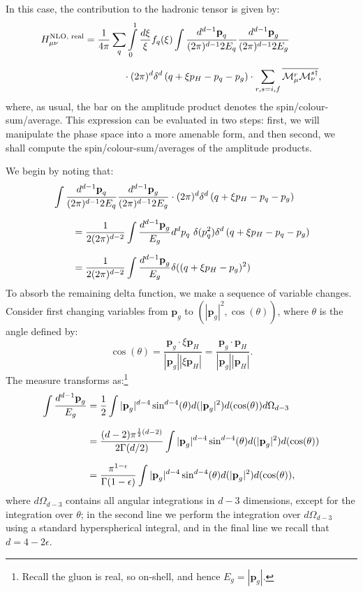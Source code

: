 \documentclass[withindex,glossary]{cam-thesis}
\renewcommand{\vec}[1]{\textbf{#1}} %
\begin{document}
In this case, the contribution to the hadronic tensor is given by:
\begin{align}
\label{eq:hadronic_nlo_real}
H_{\mu\nu}^{\text{NLO, real}} &= \frac{1}{4\pi} \sum_{q} \int\limits_{0}^{1} \frac{d\xi}{\xi} f_q(\xi) \int \frac{d^{d-1} \vec{p}_{q}}{(2\pi)^{d-1} 2E_{q}}  \frac{d^{d-1} \vec{p}_{g}}{(2\pi)^{d-1} 2E_{g}} \notag\\[1.5ex]
&\qquad\qquad\cdot (2\pi)^d \delta^d\left(q + \xi p_H - p_q - p_g\right) \cdot \sum_{r,s=i,f} \overline{\mathcal{M}_{\mu}^r \mathcal{M}_{\nu}^{s\dagger}} ,
\end{align}
where, as usual, the bar on the amplitude product denotes the spin/colour-sum/average. This expression can be evaluated in two steps: first, we will manipulate the phase space into a more amenable form, and then second, we shall compute the spin/colour-sum/averages of the amplitude products.

We begin by noting that:
\begin{align}
&\int \frac{d^{d-1} \vec{p}_{q}}{(2\pi)^{d-1} 2E_{q}}  \frac{d^{d-1} \vec{p}_{g}}{(2\pi)^{d-1} 2E_{g}} \cdot (2\pi)^d \delta^d\left(q + \xi p_H - p_q - p_g\right) \notag\\[1.5ex]
&\qquad= \frac{1}{2(2\pi)^{d-2}} \int  \frac{d^{d-1} \vec{p}_{g}}{E_{g}} d^d p_q\ \delta(p_q^2) \delta^d\left(q + \xi p_H - p_q - p_g\right)\notag\\[1.5ex]
&\qquad= \frac{1}{2(2\pi)^{d-2}} \int \frac{d^{d-1} \vec{p}_{g}}{E_{g}} \delta( (q + \xi p_H - p_g)^2) 
\end{align}
To absorb the remaining delta function, we make a sequence of variable changes. Consider first changing variables from $\vec{p}_g$ to $(|\vec{p}_g|^2, \cos(\theta))$, where $\theta$ is the angle defined by:
\begin{equation}
\cos(\theta) = \frac{\vec{p}_g \cdot \xi \vec{p}_H}{|\vec{p}_g| |\xi \vec{p}_H|} = \frac{\vec{p}_g \cdot \vec{p}_H}{|\vec{p}_g| |\vec{p}_H|}.
\end{equation}
The measure transforms as:\footnote{Recall the gluon is real, so on-shell, and hence $E_g = |\vec{p}_g|$.}
\begin{align}
\int \frac{d^{d-1} \vec{p}_g}{E_g} &= \frac{1}{2} \int |\vec{p}_g|^{d-4} \sin^{d-4}(\theta) d(|\vec{p}_g|^2) d(\cos(\theta)) d\Omega_{d-3}\notag \\[1.5ex]
&= \frac{(d-2) \pi^{\frac{1}{2}(d-2)}}{2\Gamma(d/2)} \int  |\vec{p}_g|^{d-4} \sin^{d-4}(\theta) d(|\vec{p}_g|^2) d(\cos(\theta)) \notag\\[1.5ex]
&= \frac{\pi^{1-\epsilon}}{\Gamma(1-\epsilon)} \int  |\vec{p}_g|^{d-4} \sin^{d-4}(\theta) d(|\vec{p}_g|^2) d(\cos(\theta)),
\end{align}
where $d\Omega_{d-3}$ contains all angular integrations in $d-3$ dimensions, except for the integration over $\theta$; in the second line we perform the integration over $d\Omega_{d-3}$ using a standard hyperspherical integral, and in the final line we recall that $d = 4 - 2\epsilon$.
\end{document}
